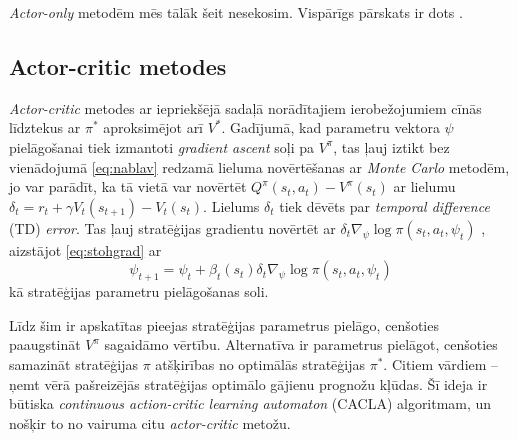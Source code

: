 \documentclass{ludis} %
\begin{document}
\textit{Actor-only} metodēm mēs tālāk šeit nesekosim.
Vispārīgs pārskats ir dots \autocite{Hasselt2012}.
 
\subsection{Actor-critic metodes}
\textit{Actor-critic} metodes ar iepriekšējā sadaļā norādītajiem ierobežojumiem
cīnās līdztekus ar $\pi^*$ aproksimējot arī $V^*$. Gadījumā, kad parametru
vektora $\psi$ pielāgošanai tiek izmantoti \textit{gradient ascent} soļi pa
$V^\pi$, tas ļauj iztikt bez vienādojumā \eqref{eq:nablav} redzamā lieluma
novērtēšanas ar \textit{Monte Carlo} metodēm, jo var parādīt, ka tā vietā var
novērtēt $Q^\pi(s_t, a_t) - V^\pi(s_t)$ ar lielumu $\delta_t = r_{t} + \gamma
V_t(s_{t+1}) - V_t(s_t)$. Lielums $\delta_t$ tiek dēvēts par \textit{temporal
  difference} (TD) \textit{error}. Tas ļauj stratēģijas gradientu novērtēt ar
$\delta_t \nabla_\psi \log \pi(s_t,a_t,\psi_t)$ \autocite{sutton2000policy},
aizstājot \eqref{eq:stohgrad} ar
\begin{equation} \label{eq:psi}
	\psi_{t+1} = \psi_t + \beta_t(s_t) \delta_t \nabla_\psi \log \pi(s_t,a_t,\psi_t)
\end{equation}
kā stratēģijas parametru pielāgošanas soli.

Līdz šim ir apskatītas pieejas stratēģijas parametrus pielāgo, cenšoties
paaugstināt $V^\pi$ sagaidāmo vērtību. Alternatīva ir parametrus pielāgot,
cenšoties samazināt stratēģijas $\pi$ atšķirības no optimālās stratēģijas
$\pi^*$. Citiem vārdiem -- ņemt vērā pašreizējās stratēģijas optimālo gājienu
prognožu kļūdas. Šī ideja ir būtiska \textit{continuous action-critic learning
  automaton} (CACLA) algoritmam, un nošķir to no vairuma citu
\textit{actor-critic} metožu.
\end{document}
